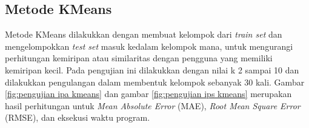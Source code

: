 \subsection{Metode KMeans}
\label{subsec: metode kmeans}

Metode KMeans dilakukkan dengan membuat kelompok dari \textit{train set} dan mengelompokkan \textit{test set} masuk kedalam kelompok mana, untuk mengurangi perhitungan kemiripan atau similaritas dengan pengguna yang memiliki kemiripan kecil. Pada pengujian ini dilakukkan dengan nilai k 2 sampai 10 dan dilakukkan pengulangan dalam membentuk kelompok sebanyak 30 kali. Gambar \ref{fig:pengujian ipa kmeans} dan gambar \ref{fig:pengujian ips kmeans} merupakan hasil perhitungan untuk \textit{Mean Absolute Error} (MAE), \textit{Root Mean Square Error} (RMSE), dan eksekusi waktu program.


